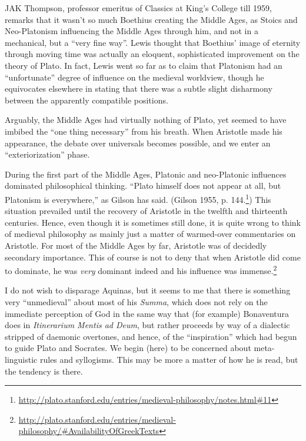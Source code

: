 JAK Thompson, professor emeritus of Classics at King's College till 1959, remarks that it wasn't so much Boethius creating the Middle Ages, as Stoics and Neo-Platonism influencing the Middle Ages through him, and not in a mechanical, but a ``very fine way''. Lewis thought that Boethius' image of eternity through moving time was actually an eloquent, sophisticated improvement on the theory of Plato. In fact, Lewis went so far as to claim that Platonism had an ``unfortunate'' degree of influence on the medieval worldview, though he equivocates elsewhere in stating that there was a subtle slight disharmony between the apparently compatible positions.

Arguably, the Middle Ages had virtually nothing of Plato, yet seemed to have imbibed the ``one thing necessary'' from his breath. When Aristotle made his appearance, the debate over universals becomes possible, and we enter an ``exteriorization'' phase.

\begin{quotex}
During the first part of the Middle Ages, Platonic and neo-Platonic influences dominated philosophical thinking. ``Plato himself does not appear at all, but Platonism is everywhere,'' as Gilson has said. (Gilson 1955, p. 144.\footnote{\url{http://plato.stanford.edu/entries/medieval-philosophy/notes.html\#11}}) This situation prevailed until the recovery of Aristotle in the twelfth and thirteenth centuries. Hence, even though it is sometimes still done, it is quite wrong to think of medieval philosophy as mainly just a matter of warmed-over commentaries on Aristotle. For most of the Middle Ages by far, Aristotle was of decidedly secondary importance. This of course is not to deny that when Aristotle did come to dominate, he was \emph{very} dominant indeed and his influence was immense.\footnote{\url{http://plato.stanford.edu/entries/medieval-philosophy/\#AvailabilityOfGreekTexts}}
\end{quotex}


I do not wish to disparage Aquinas, but it seems to me that there is something very ``unmedieval'' about most of his \emph{Summa}, which does not rely on the immediate perception of God in the same way that (for example) Bonaventura does in \emph{Itinerarium Mentis ad Deum}, but rather proceeds by way of a dialectic stripped of daemonic overtones, and hence, of the ``inspiration'' which had begun to guide Plato and Socrates. We begin (here) to be concerned about meta-linguistic rules and syllogisms. This may be more a matter of how he is read, but the tendency is there.

